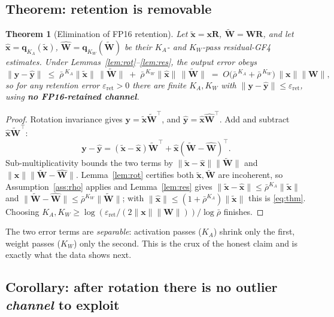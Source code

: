 \documentclass[11pt]{article}
\newtheorem{theorem}{Theorem}
\theoremstyle{remark}
\newcommand{\norm}[1]{\lVert #1 \rVert}
\newcommand{\xt}{\tilde{\bm x}}
\newcommand{\Wt}{\tilde{\bm W}}
\begin{document}
\subsection{Theorem: retention is removable}

\begin{theorem}[Elimination of FP16 retention]
\label{thm:main}
Let $\xt=\bm x\bm R$, $\Wt=\bm W\bm R$, and let $\hat{\bm x}=\bm q_{K_A}(\xt)$,
$\hat{\bm W}=\bm q_{K_W}(\Wt)$ be their $K_A$- and $K_W$-pass residual-GF4
estimates. Under Lemmas~\ref{lem:rot}--\ref{lem:res}, the output error obeys
\begin{equation}
\label{eq:thm}
\norm{\bm y-\hat{\bm y}}
   \;\le\; \bar\rho^{\,K_A}\norm{\xt}\,\norm{\Wt}
        \;+\; \bar\rho^{\,K_W}\norm{\hat{\bm x}}\,\norm{\Wt}
   \;=\; O\!\big(\bar\rho^{\,K_A}+\bar\rho^{\,K_W}\big)\,
         \norm{\bm x}\norm{\bm W},
\end{equation}
so for any retention error $\varepsilon_{\mathrm{ret}}>0$ there are finite
$K_A,K_W$ with $\norm{\bm y-\hat{\bm y}}\le\varepsilon_{\mathrm{ret}}$, using
\textbf{no FP16-retained channel}.
\end{theorem}

\begin{proof}
Rotation invariance gives $\bm y=\xt\Wt^{\!\top}$, and
$\hat{\bm y}=\hat{\bm x}\hat{\bm W}^{\!\top}$. Add and subtract
$\hat{\bm x}\Wt^{\!\top}$:
\[
\bm y-\hat{\bm y}
 = (\xt-\hat{\bm x})\Wt^{\!\top}
 + \hat{\bm x}(\Wt-\hat{\bm W})^{\!\top}.
\]
Sub-multiplicativity bounds the two terms by
$\norm{\xt-\hat{\bm x}}\norm{\Wt}$ and
$\norm{\hat{\bm x}}\norm{\Wt-\hat{\bm W}}$. Lemma~\ref{lem:rot} certifies both
$\xt,\Wt$ are incoherent, so Assumption~\ref{ass:rho} applies and
Lemma~\ref{lem:res} gives
$\norm{\xt-\hat{\bm x}}\le\bar\rho^{K_A}\norm{\xt}$ and
$\norm{\Wt-\hat{\bm W}}\le\bar\rho^{K_W}\norm{\Wt}$; with
$\norm{\hat{\bm x}}\le(1+\bar\rho^{K_A})\norm{\xt}$ this is \eqref{eq:thm}.
Choosing $K_A,K_W\ge\log(\varepsilon_{\mathrm{ret}}/(2\norm{\bm x}\norm{\bm W}))
/\log\bar\rho$ finishes.
\end{proof}

The two error terms are \emph{separable}: activation passes ($K_A$) shrink only
the first, weight passes ($K_W$) only the second. This is the crux of the honest
claim and is exactly what the data shows next.

\subsection{Corollary: after rotation there is no outlier \emph{channel} to exploit}
\end{document}
